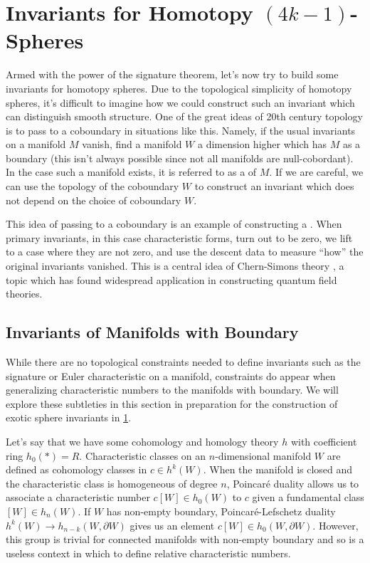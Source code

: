 \pagebreak
\section{Invariants for Homotopy \texorpdfstring{${(4k-1)}$}{(4k-1)}-Spheres}\label{sec:invariants-for-homotopy-4k-1-spheres}

Armed with the power of the signature theorem, let's now try to build some invariants for homotopy spheres.
Due to the topological simplicity of homotopy spheres, it's difficult to imagine how we could construct such an invariant which can distinguish smooth structure. One of the great ideas of 20th century topology is to pass to a coboundary in situations like this. Namely, if the usual invariants on a manifold $M$ vanish, find a manifold $W$ a dimension higher which has $M$ as a boundary (this isn't always possible since not all manifolds are null-cobordant).
In the case such a manifold exists, it is referred to as a  of $M$. If we are careful, we can use the topology of the coboundary $W$ to construct an invariant which does not depend on the choice of coboundary $W$.

\begin{remark}
	This idea of passing to a coboundary is an example of constructing a . When primary invariants, in this case characteristic forms, turn out to be zero, we lift to a case where they are not zero, and use the descent data to measure ``how'' the original invariants vanished. This is a central idea of Chern-Simons theory \cite{chernsimons1974geometric}, a topic which has found widespread application in constructing quantum field theories.
\end{remark}

\subsection{Invariants of Manifolds with Boundary}\label{sec:relative-invariants}

While there are no topological constraints needed to define invariants such as the signature or Euler characteristic on a manifold, constraints do appear when generalizing characteristic numbers to the manifolds with boundary. We will explore these subtleties in this section in preparation for the construction of exotic sphere invariants in \cref{sec:invariants-for-homotopy-4k-1-spheres}.

Let's say that we have some cohomology and homology theory $h$ with coefficient ring $h_0(*)=R$.
Characteristic classes on an $n$-dimensional manifold $W$ are defined as cohomology classes in $c\in h^k(W)$. When the manifold is closed and the characteristic class is homogeneous of degree $n$, Poincar\'e duality allows us to associate a characteristic number $c[W]\in h_0(W)$ to $c$ given a fundamental class $[W]\in h_n(W)$. If $W$ has non-empty boundary, Poincar\'e-Lefschetz duality $h^k(W)\to h_{n-k}(W,\partial W)$ gives us an element $c[W]\in h_0(W,\partial W)$. However, this group is trivial for connected manifolds with non-empty boundary and so is a useless context in which to define relative characteristic numbers.

